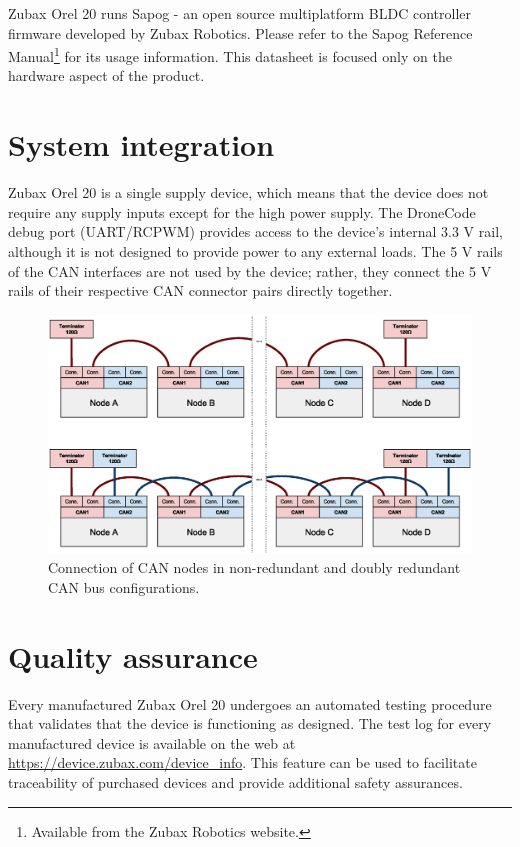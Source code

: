 \documentclass{zubaxdoc}
\begin{document}
Zubax Orel 20 runs Sapog - an open source multiplatform BLDC controller firmware
developed by Zubax Robotics.
Please refer to the Sapog Reference Manual\footnote{Available from the Zubax Robotics website.}
for its usage information.
This datasheet is focused only on the hardware aspect of the product.

\section{System integration}

Zubax Orel 20 is a single supply device, which means that the device does
not require any supply inputs except for the high power supply.
The DroneCode debug port (UART/RCPWM) provides access to the device's internal 3.3 V rail,
although it is not designed to provide power to any external loads.
The 5 V rails of the CAN interfaces are not used by the device; rather,
they connect the 5 V rails of their respective CAN connector pairs directly together.

\begin{figure}[hb]
    \centering
	\includegraphics[width=\textwidth]{can_daisy_chain}
	\caption{Connection of CAN nodes in non-redundant and doubly redundant CAN bus configurations.
	\label{can_daisy_chain_non_redundant}}
\end{figure}

\section{Quality assurance}

Every manufactured Zubax Orel 20 undergoes an automated testing procedure that validates that
the device is functioning as designed.
The test log for every manufactured device is available on the web at
\url{https://device.zubax.com/device_info}.
This feature can be used to facilitate traceability of purchased devices and
provide additional safety assurances.
\end{document}
